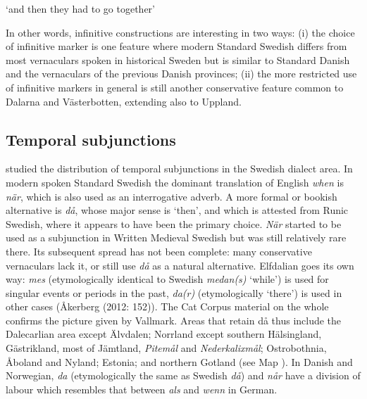 \begin{styleTranslation}
‘and then they had to go together’ 

\end{styleTranslation}

\begin{styleBodyTextFirst}
In other words, infinitive constructions are interesting in two ways: (i) the choice of infinitive marker is one feature where modern Standard Swedish differs from most vernaculars spoken in historical Sweden but is similar to Standard Danish and the vernaculars of the previous Danish provinces; (ii) the more restricted use of infinitive markers in general is still another conservative feature common to Dalarna and Västerbotten, extending also to Uppland. 

\end{styleBodyTextFirst}

\subsection{\rmfamily Temporal subjunctions}

\begin{styleBodyTextFirst}
\citet{Vallmark1936} studied the distribution of temporal subjunctions in the Swedish dialect area. In modern spoken Standard Swedish the dominant translation of English \textit{when} is \textit{när}, which is also used as an interrogative adverb. A more formal or bookish alternative is \textit{då}, whose major sense is ‘then’, and which is attested from Runic Swedish, where it appears to have been the primary choice. \textit{När }started to be used as a subjunction in Written Medieval Swedish but was still relatively rare there. Its subsequent spread has not been complete: many conservative vernaculars lack it, or still use \textit{då }as a natural alternative. Elfdalian goes its own way: \textit{mes} (etymologically identical to Swedish \textit{medan(s)} ‘while’) is used for singular events or periods in the past, \textit{da(r)} (etymologically ‘there’) is used in other cases (Åkerberg (2012: 152)). The Cat Corpus material on the whole confirms the picture given by Vallmark. Areas that retain då thus include the Dalecarlian area except Älvdalen; Norrland except southern Hälsingland, Gästrikland, most of Jämtland, \textit{Pitemål} and \textit{Nederkalixmål}; Ostrobothnia, Åboland and Nyland; Estonia; and northern Gotland (see Map ). In Danish and Norwegian, \textit{da} (etymologically the same as Swedish \textit{då}) and \textit{når} have a division of labour which resembles that between \textit{als} and \textit{wenn} in German. 

\end{styleBodyTextFirst}

